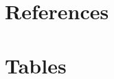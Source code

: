 \documentclass[12pt]{article}
\numberwithin{equation}{section}
\begin{document}

	
	\newpage
	\section*{References}
%	
		
		
		
\newpage
\section*{Tables}
\end{document}
